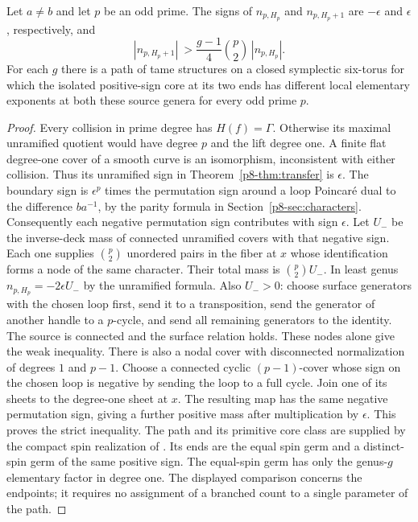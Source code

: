 \begin{corollary}\label{p8-cor:prime-growth}
Let $a\ne b$ and let $p$ be an odd prime. The signs of $n_{p,H_p}$
and $n_{p,H_p+1}$ are $-\epsilon$ and $\epsilon$, respectively, and
\[
 |n_{p,H_p+1}|\ > \frac{g-1}{4}\binom{p}{2}\,|n_{p,H_p}| .
\]
For each $g$ there is a path of tame structures on a closed
symplectic six-torus for which the isolated positive-sign core at
its two ends has different local elementary exponents at both these
source genera for every odd prime $p$.
\end{corollary}
\begin{proof}
Every collision in prime degree has $H(f)=\Gamma$. Otherwise its
maximal unramified quotient would have degree $p$ and the lift degree
one. A finite flat degree-one cover of a smooth curve is an
isomorphism, inconsistent with either collision. Thus its unramified
sign in Theorem~\ref{p8-thm:transfer} is $\epsilon$. The boundary sign
is $\epsilon^p$ times the permutation sign around a loop Poincar\'e
dual to the difference $ba^{-1}$, by the parity formula in
Section~\ref{p8-sec:characters}. Consequently each negative permutation
sign contributes with sign $\epsilon$. Let $U_-$ be the inverse-deck
mass of connected unramified covers with that negative sign. Each
one supplies $\binom p2$ unordered pairs in the fiber at $x$ whose
identification forms a node of the same character. Their total mass
is $\binom p2 U_-$. In least genus $n_{p,H_p}=-2\epsilon U_-$ by
the unramified formula. Also $U_->0$: choose surface generators
with the chosen loop first, send it to a transposition, send the
generator of another handle to a $p$-cycle, and send all remaining
generators to the identity. The source is connected and the surface
relation holds. These nodes alone give the weak inequality. There is also a nodal cover
with disconnected normalization of degrees $1$ and $p-1$. Choose a
connected cyclic $(p-1)$-cover whose sign on the chosen loop is negative
by sending the loop to a full cycle. Join one of its sheets to the
degree-one sheet at $x$. The resulting map has the same negative
permutation sign, giving a further positive mass after multiplication
by $\epsilon$. This proves the strict inequality.
The path and its primitive core class are supplied by the compact
spin realization of \cite[\S15]{WueUnramified}. Its ends are the equal
spin germ and a distinct-spin germ of the same positive sign. The
equal-spin germ has only the genus-$g$ elementary factor in degree
one. The displayed comparison concerns the endpoints; it requires
no assignment of a branched count to a single parameter of the path.
\end{proof}

